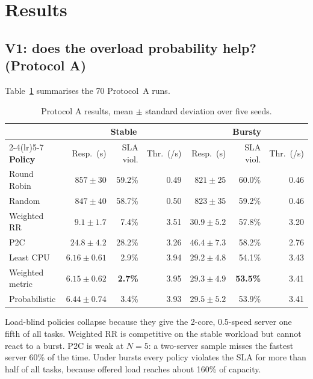 \documentclass[11pt,a4paper]{article}
\begin{document}
\section{Results}

\subsection{V1: does the overload probability help? (Protocol A)}
Table~\ref{tab:v1main} summarises the 70 Protocol~A runs.

\begin{table}[H]
\caption{Protocol A results, mean $\pm$ standard deviation over five seeds.}\label{tab:v1main}
\centering
\small
\begin{tabular}{lrrrrrr}
\toprule
& \multicolumn{3}{c}{\textbf{Stable}} & \multicolumn{3}{c}{\textbf{Bursty}}\\
\cmidrule(lr){2-4}\cmidrule(lr){5-7}
\textbf{Policy} & Resp.\ (s) & SLA viol. & Thr.\ (/s) & Resp.\ (s) & SLA viol. & Thr.\ (/s)\\
\midrule
Round Robin     & $857 \pm 30$   & 59.2\% & 0.49 & $821 \pm 25$  & 60.0\% & 0.46\\
Random          & $847 \pm 40$   & 58.7\% & 0.50 & $823 \pm 35$  & 59.2\% & 0.46\\
Weighted RR     & $9.1 \pm 1.7$  & 7.4\%  & 3.51 & $30.9 \pm 5.2$ & 57.8\% & 3.20\\
P2C             & $24.8 \pm 4.2$ & 28.2\% & 3.26 & $46.4 \pm 7.3$ & 58.2\% & 2.76\\
Least CPU       & $6.16 \pm 0.61$ & 2.9\% & 3.94 & $29.2 \pm 4.8$ & 54.1\% & 3.43\\
Weighted metric & $\mathbf{6.15 \pm 0.62}$ & \textbf{2.7\%} & 3.95 & $29.3 \pm 4.9$ & \textbf{53.5\%} & 3.41\\
Probabilistic   & $6.44 \pm 0.74$ & 3.4\% & 3.93 & $29.5 \pm 5.2$ & 53.9\% & 3.41\\
\bottomrule
\end{tabular}
\end{table}

Load-blind policies collapse because they give the 2-core, 0.5-speed server one fifth of all tasks.
Weighted RR is competitive on the stable workload but cannot react to a burst. P2C is weak at $N=5$: a
two-server sample misses the fastest server 60\% of the time. Under bursts every policy violates the SLA for
more than half of all tasks, because offered load reaches about 160\% of capacity.
\end{document}

